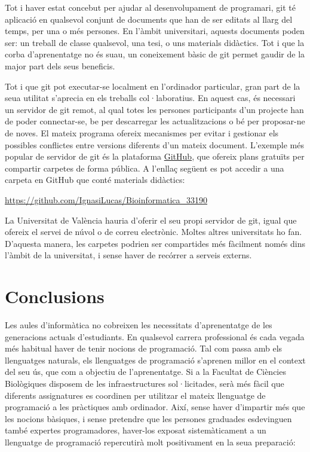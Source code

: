 \documentclass[a4paper,12pt]{article}
\begin{document}
Tot i haver estat concebut per ajudar al desenvolupament de programari, \textsf{git}
té aplicació en qualsevol conjunt de documents que han de ser editats al llarg del temps,
per una o més persones. En l'àmbit universitari, aquests documents poden ser: un treball de
classe qualsevol, una tesi, o uns materials didàctics. Tot i que la corba d'aprenentatge no és
suau, un coneixement bàsic de \textsf{git} permet gaudir de la major part dels seus beneficis.

Tot i que \textsf{git} pot executar-se localment en l'ordinador particular, gran part de la
seua utilitat s'aprecia en els treballs col·laboratius. En aquest cas, és necessari un
servidor de \textsf{git} remot, al qual totes les persones participants d'un projecte han
de poder connectar-se, be per descarregar les actualitzacions o bé per proposar-ne de noves.
El mateix programa ofereix mecanismes per evitar i gestionar els possibles conflictes entre
versions diferents d'un mateix document. L'exemple més popular de servidor de \textsf{git}
és la plataforma \href{https://github.com}{GitHub}, que ofereix plans gratuïts per compartir
carpetes de forma pública. A l'enllaç següent es pot accedir a una carpeta en GitHub que
conté materials didàctics:

\href{https://github.com/IgnasiLucas/Bioinformatica\_33190}{https://github.com/IgnasiLucas/Bioinformatica\_33190}

La Universitat de València hauria d'oferir el seu propi servidor de \textsf{git}, igual que
ofereix el servei de núvol o de correu electrònic. Moltes altres universitats ho fan. D'aquesta
manera, les carpetes podrien ser compartides més fàcilment només dins l'àmbit de la universitat,
i sense haver de recórrer a serveis externs.

\section{Conclusions}
Les aules d'informàtica no cobreixen les necessitats d'aprenentatge de les generacions actuals
d'estudiants. En qualsevol carrera professional és cada vegada més habitual haver de tenir nocions
de programació. Tal com passa amb els llenguatges naturals, els llenguatges de programació
s'aprenen millor en el context del seu ús, que com a objectiu de l'aprenentatge. Si a la
Facultat de Ciències Biològiques disposem de les infraestructures sol·licitades, serà més
fàcil que diferents assignatures es coordinen per utilitzar el mateix llenguatge de programació
a les pràctiques amb ordinador. Així, sense haver d'impartir més que les nocions bàsiques,
i sense pretendre que les persones graduades esdevinguen també expertes programadores, haver-los
exposat sistemàticament a un llenguatge de programació repercutirà molt positivament en la seua
preparació:
\end{document}
